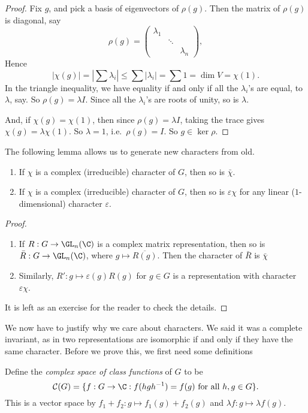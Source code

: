 \documentclass[a4paper]{article}
\begin{document}
\begin{proof}
  Fix $g$, and pick a basis of eigenvectors of $\rho(g)$. Then the matrix of $\rho(g)$ is diagonal, say
  \[
    \rho(g) =
    \begin{pmatrix}
      \lambda_1\\
      & \ddots\\
      && \lambda_n
    \end{pmatrix},
  \]
  Hence
  \[
    |\chi(g)| = \left|\sum \lambda_i\right| \leq \sum |\lambda_i| = \sum 1 = \dim V = \chi(1).
  \]
  In the triangle inequality, we have equality if and only if all the $\lambda_i$'s are equal, to $\lambda$, say. So $\rho(g) = \lambda I$. Since all the $\lambda_i$'s are roots of unity, so is $\lambda$.

  And, if $\chi(g) = \chi(1)$, then since $\rho(g) = \lambda I$, taking the trace gives $\chi(g) = \lambda \chi(1)$. So $\lambda = 1$, i.e.\ $\rho(g) = I$. So $g \in \ker \rho$.
\end{proof}

The following lemma allows us to generate new characters from old.
\begin{lemma}\leavevmode
  \begin{enumerate}
    \item If $\chi$ is a complex (irreducible) character of $G$, then so is $\bar{\chi}$.
    \item If $\chi$ is a complex (irreducible) character of $G$, then so is $\varepsilon \chi$ for any linear ($1$-dimensional) character $\varepsilon$.
  \end{enumerate}
\end{lemma}

\begin{proof}\leavevmode
  \begin{enumerate}
    \item If $R: G \to \GL_n(\C)$ is a complex matrix representation, then so is $\bar{R}: G \to \GL_n(\C)$, where $g \mapsto \overline{R(g)}$. Then the character of $\bar{R}$ is $\bar{\chi}$
    \item Similarly, $R': g \mapsto \varepsilon(g) R(g)$ for $g \in G$ is a representation with character $\varepsilon \chi$.
  \end{enumerate}
  It is left as an exercise for the reader to check the details.
\end{proof}

We now have to justify why we care about characters. We said it was a complete invariant, as in two representations are isomorphic if and only if they have the same character. Before we prove this, we first need some definitions
\begin{defi}
  Define the \emph{complex space of class functions} of $G$ to be
  \[
    \mathcal{C}(G) = \{f: G \to \C: f(hgh^{-1}) = f(g)\text{ for all }h, g \in G\}.
  \]
  This is a vector space by $f_1 + f_2 : g \mapsto f_1(g) + f_2(g)$ and $\lambda f: g \mapsto \lambda f(g)$.
\end{defi}
\end{document}
